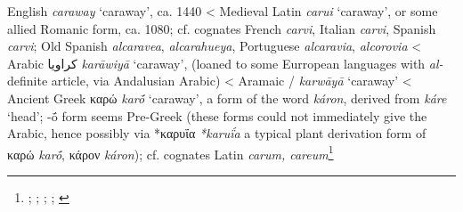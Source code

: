 \begin{etymology}\label{ety:caraway}
English \textit{caraway} `caraway', ca. 1440
< Medieval Latin \textit{carui} `caraway', or some allied Romanic form, ca. 1080; cf. cognates French \textit{carvi}, Italian \textit{carvi}, Spanish \textit{carvi}; Old Spanish \textit{alcaravea}, \textit{alcarahueya}, Portuguese \textit{alcaravia}, \textit{alcorovia}
< Arabic {كراويا} \textit{karāwiyā} `caraway', (loaned to some Eurropean languages with \textit{al-} definite article, via Andalusian Arabic)
< Aramaic {/} \textit{karwāyā} `caraway'
< Ancient Greek {καρώ} \textit{karṓ} `caraway', a form of the word \textit{káron}, derived from \textit{káre} `head'; -ṓ form seems Pre-Greek (these forms could not immediately give the Arabic, hence possibly via *καρυΐα \textit{*karuḯa} a typical plant derivation form of καρώ \textit{karṓ}, κάρον \textit{káron}); cf. cognates Latin \textit{carum, careum}\footnote{\textcite[s.v. caraway]{oed}; \textcite[s.v. caraway]{ahd}; \textcites[74]{corriente_dictionary_2008}[carvi]{tlfi}; \textcites[207]{low_aramaeische_1881}[437-438]{low_flora_1924}; \textcites[653]{beekes_etymological_2010}[599]{sokoloff_dictionary_2002}}
\end{etymology}